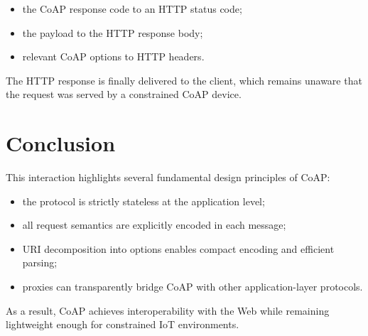 \documentclass{scrbook}
\begin{document}
\begin{itemize}
    \item the CoAP response code to an HTTP status code;
    \item the payload to the HTTP response body;
    \item relevant CoAP options to HTTP headers.
\end{itemize}

The HTTP response is finally delivered to the client, which remains unaware that the request was served by a constrained CoAP device.

\section{Conclusion}

This interaction highlights several fundamental design principles of CoAP:

\begin{itemize}
    \item the protocol is strictly stateless at the application level;
    \item all request semantics are explicitly encoded in each message;
    \item URI decomposition into options enables compact encoding and efficient parsing;
    \item proxies can transparently bridge CoAP with other application-layer protocols.
\end{itemize}

As a result, CoAP achieves interoperability with the Web while remaining lightweight enough for constrained IoT environments.
\end{document}
